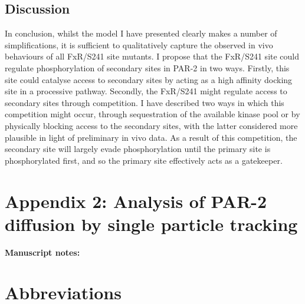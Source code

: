 \documentclass[12pt]{"report"}
\begin{document}
\section*{Discussion}

In conclusion, whilst the model I have presented clearly makes a number of simplifications, it is sufficient to qualitatively capture the observed in vivo behaviours of all FxR/S241 site mutants. I propose that the FxR/S241 site could regulate phosphorylation of secondary sites in PAR-2 in two ways. Firstly, this site could catalyse access to secondary sites by acting as a high affinity docking site in a processive pathway. Secondly, the FxR/S241 might regulate access to secondary sites through competition. I have described two ways in which this competition might occur, through sequestration of the available kinase pool or by physically blocking access to the secondary sites, with the latter considered more plausible in light of preliminary in vivo data. As a result of this competition, the secondary site will largely evade phosphorylation until the primary site is phosphorylated first, and so the primary site effectively acts as a gatekeeper. \\


\clearpage
\chapter*{Appendix 2: Analysis of PAR-2 diffusion by single particle tracking}

\textbf{Manuscript notes:}\\




\clearpage
\chapter*{Abbreviations}





\clearpage
{}

\AtNextBibliography{\scriptsize}
\printbibliography
\end{document}
